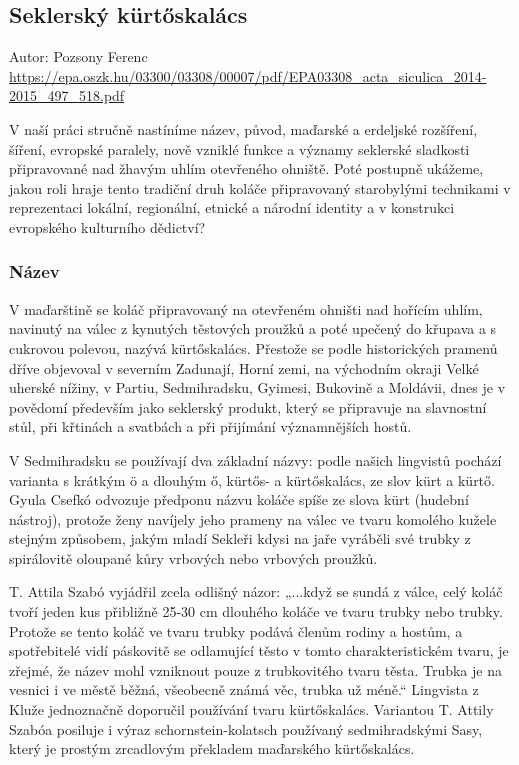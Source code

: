 \subsection{Seklerský
kürtőskalács}\label{250319-1326}

Autor: Pozsony Ferenc
\url{https://epa.oszk.hu/03300/03308/00007/pdf/EPA03308_acta_siculica_2014-2015_497_518.pdf}

V naší práci stručně nastíníme název, původ, maďarské a erdeljské
rozšíření, šíření, evropské paralely, nově vzniklé funkce a významy
seklerské sladkosti připravované nad žhavým uhlím otevřeného ohniště.
Poté postupně ukážeme, jakou roli hraje tento tradiční druh koláče
připravovaný starobylými technikami v reprezentaci lokální, regionální,
etnické a národní identity a v konstrukci evropského kulturního
dědictví?

\subsubsection{Název}\label{250319-1326}

V maďarštině se koláč připravovaný na otevřeném ohništi nad hořícím
uhlím, navinutý na válec z kynutých těstových proužků a poté upečený do
křupava a s cukrovou polevou, nazývá kürtőskalács. Přestože se podle
historických pramenů dříve objevoval v severním Zadunají, Horní zemi, na
východním okraji Velké uherské nížiny, v Partiu, Sedmihradsku, Gyimesi,
Bukovině a Moldávii, dnes je v povědomí především jako seklerský
produkt, který se připravuje na slavnostní stůl, při křtinách a svatbách
a při přijímání významnějších hostů.

V Sedmihradsku se používají dva základní názvy: podle našich lingvistů
pochází varianta s krátkým ö a dlouhým ő, kürtős- a kürtőskalács, ze
slov kürt a kürtő. Gyula Csefkó odvozuje předponu názvu koláče spíše ze
slova kürt (hudební nástroj), protože ženy navíjely jeho prameny na
válec ve tvaru komolého kužele stejným způsobem, jakým mladí Sekleři
kdysi na jaře vyráběli své trubky z spirálovitě oloupané kůry vrbových
nebo vrbových proužků.

T. Attila Szabó vyjádřil zcela odlišný názor: „...když se sundá z válce,
celý koláč tvoří jeden kus přibližně 25-30 cm dlouhého koláče ve tvaru
trubky nebo trubky. Protože se tento koláč ve tvaru trubky podává členům
rodiny a hostům, a spotřebitelé vidí páskovitě se odlamující těsto v
tomto charakteristickém tvaru, je zřejmé, že název mohl vzniknout pouze
z trubkovitého tvaru těsta. Trubka je na vesnici i ve městě běžná,
všeobecně známá věc, trubka už méně.`` Lingvista z Kluže jednoznačně
doporučil používání tvaru kürtőskalács. Variantou T. Attily Szabóa
posiluje i výraz schornstein-kolatsch používaný sedmihradskými Sasy,
který je prostým zrcadlovým překladem maďarského kürtőskalács.


